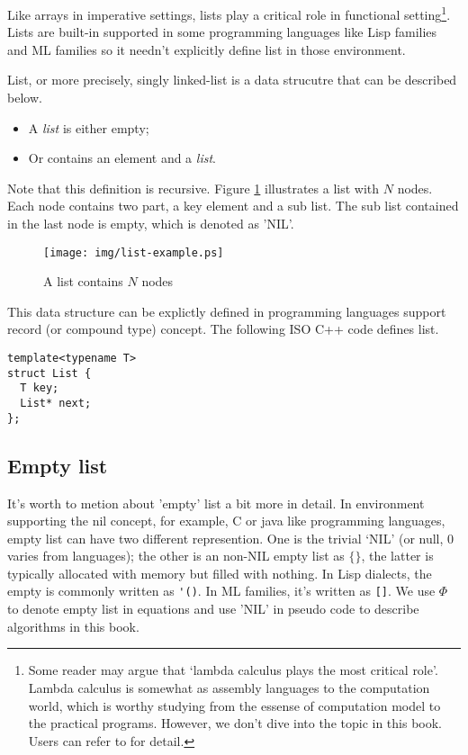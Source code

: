 \documentclass{article}
\begin{document}
Like arrays in imperative settings, lists play a critical role in functional setting\footnote{Some 
reader may argue that `lambda calculus plays the most critical role'.
Lambda calculus is somewhat as assembly languages to the computation world, which 
is worthy studying from the essense of computation model to the practical programs.
However, we don't dive into the topic in this book. Users can refer to \cite{mittype}
for detail.}. Lists are built-in supported in some programming languages like Lisp
families and ML families so it needn't explicitly define list in those environment.

List, or more precisely, singly linked-list is a data strucutre that can be described
below.

\begin{itemize}
\item A {\em list} is either empty;
\item Or contains an element and a {\em list}.
\end{itemize}

Note that this definition is recursive. Figure \ref{fig:list-example} illustrates
a list with $N$ nodes. Each node contains two part, a key element and a sub list. The
sub list contained in the last node is empty, which is denoted as 'NIL'.

\begin{figure}[htbp]
        \centering
        \texttt{[image: img/list-example.ps]}
        \caption{A list contains $N$ nodes} \label{fig:list-example}
\end{figure}

This data structure can be explictly defined in programming languages support record
(or compound type) concept. The following ISO C++ code defines list.

\lstset{language=C++}
\begin{lstlisting}
template<typename T>
struct List {
  T key;
  List* next;
};
\end{lstlisting}

\subsection{Empty list}
It's worth to metion about 'empty' list a bit more in detail. In environment supporting the
nil concept, for example, C or java like programming languages, empty list can have two
different represention. One is the trivial `NIL' (or null, 0 varies from languages);
the other is an non-NIL empty list as $\{ \}$, the latter is typically allocated with
memory but filled with nothing. In Lisp dialects, the empty is commonly written as \verb|'()|.
In ML families, it's written as \verb|[]|. We use $\Phi$ to denote empty list in equations
and use 'NIL' in pseudo code to describe algorithms in this book.
\end{document}
